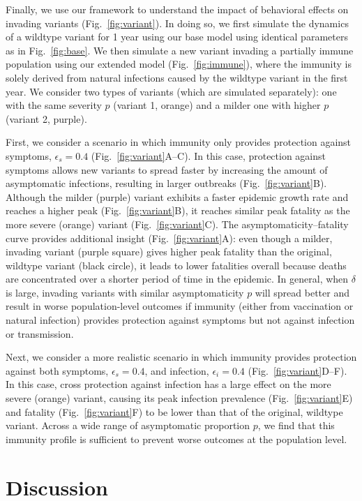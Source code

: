 \documentclass[12pt]{article}
\newcommand{\fref}[1]{Fig.~\ref{fig:#1}}
\begin{document}
Finally, we use our framework to understand the impact of behavioral effects on invading variants (\fref{variant}).
In doing so, we first simulate the dynamics of a wildtype variant for 1 year using our base model using identical parameters as in \fref{base}.
We then simulate a new variant invading a partially immune population using our extended model (\fref{immune}), where the immunity is solely derived from natural infections caused by the wildtype variant in the first year.
We consider two types of variants (which are simulated separately): one with the same severity $p$ (variant 1, orange) and a milder one with higher $p$ (variant 2, purple).

First, we consider a scenario in which immunity only provides protection against symptoms, $\epsilon_s = 0.4$ (\fref{variant}A--C).
In this case, protection against symptoms allows new variants to spread faster by increasing the amount of asymptomatic infections, resulting in larger outbreaks (\fref{variant}B).
Although the milder (purple) variant exhibits a faster epidemic growth rate and reaches a higher peak (\fref{variant}B), it reaches similar peak fatality as the more severe (orange) variant (\fref{variant}C).
The asymptomaticity--fatality curve provides additional insight (\fref{variant}A): even though a milder, invading variant (purple square) gives higher peak fatality than the original, wildtype variant (black circle), it leads to lower fatalities overall because deaths are concentrated over a shorter period of time in the epidemic.
In general, when $\delta$ is large, invading variants with similar asymptomaticity $p$ will spread better and result in worse population-level outcomes if immunity (either from vaccination or natural infection) provides protection against symptoms but not against infection or transmission.

Next, we consider a more realistic scenario in which immunity provides protection against both symptoms, $\epsilon_s = 0.4$, and infection, $\epsilon_i = 0.4$ (\fref{variant}D--F).
In this case, cross protection against infection has a large effect on the more severe (orange) variant, causing its peak infection prevalence (\fref{variant}E) and fatality (\fref{variant}F) to be lower than that of the original, wildtype variant.
Across a wide range of asymptomatic proportion $p$, we find that this immunity profile is sufficient to prevent worse outcomes at the population level.

\section*{Discussion}
\end{document}
